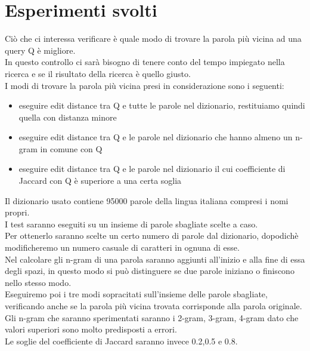 \documentclass[]{article}
\begin{document}
\section{Esperimenti svolti}
Ciò che ci interessa verificare è quale modo di trovare la parola più vicina ad una query Q è migliore.\\
In questo controllo ci sarà bisogno di tenere conto del tempo impiegato nella ricerca e se il risultato della ricerca è quello giusto.\\
I modi di trovare la parola più vicina presi in considerazione sono i seguenti:\\
\begin{itemize}
\item eseguire edit distance tra Q e tutte le parole nel dizionario, restituiamo quindi quella con distanza minore
\item eseguire edit distance tra Q e le parole nel dizionario che hanno almeno un n-gram in comune con Q
\item eseguire edit distance tra Q e le parole nel dizionario il cui coefficiente di Jaccard con Q è superiore a una certa soglia
\end{itemize}
Il dizionario usato contiene 95000 parole della lingua italiana compresi i nomi propri.\\
I test saranno eseguiti su un insieme di parole sbagliate scelte a caso.\\
Per ottenerlo saranno scelte un certo numero di parole dal dizionario, dopodichè modificheremo un numero casuale di caratteri in ognuna di esse.\\
Nel calcolare gli n-gram di una parola saranno aggiunti all'inizio e alla fine di essa degli spazi, in questo modo si può distinguere se due parole iniziano o finiscono nello stesso modo.\\ 
Eseguiremo poi i tre modi sopracitati sull'insieme delle parole sbagliate, verificando anche se la parola più vicina trovata corrisponde alla parola originale.\\
Gli n-gram che saranno sperimentati saranno i 2-gram, 3-gram, 4-gram dato che valori superiori sono molto predisposti a errori.\\
Le soglie del coefficiente di Jaccard saranno invece 0.2,0.5 e 0.8.\\
\end{document}

